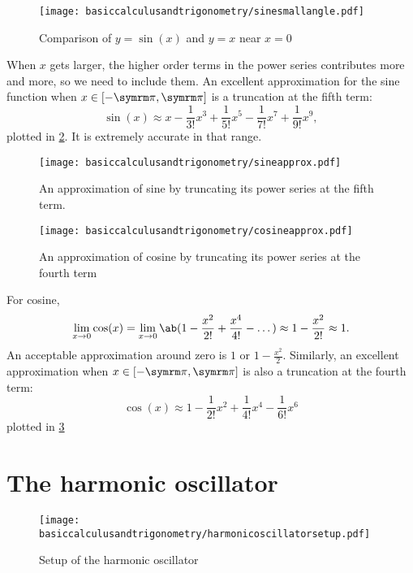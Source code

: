 \begin{figure}[ht]
	\centering
	\texttt{[image: basiccalculusandtrigonometry/sinesmallangle.pdf]}
	\caption{Comparison of $y = \sin(x)$ and $y = x$ near $x = 0$}
	\label{fig:sine_small_angle}
\end{figure}
When $x$ gets larger, the higher order terms in the power series contributes more and more, so we need to include them. An excellent approximation for the sine function when $x \in [-\cpi, \cpi]$ is a truncation at the fifth term:
\begin{equation}
	\sin(x) \approx x - \frac{1}{3!}x^3 + \frac{1}{5!}x^5 - \frac{1}{7!}x^7 + \frac{1}{9!}x^9,
\end{equation}
plotted in \cref{fig:sine_approximation}. It is extremely accurate in that range.
\begin{figure}[t]
	\centering
	\texttt{[image: basiccalculusandtrigonometry/sineapprox.pdf]}
	\caption{An approximation of sine by truncating its power series at the fifth term.}
	\label{fig:sine_approximation}
\end{figure}
\begin{figure}[t]
	\centering
	\texttt{[image: basiccalculusandtrigonometry/cosineapprox.pdf]}
	\caption{An approximation of cosine by truncating its power series at the fourth term}
	\label{fig:cosine_approximation}
\end{figure}
For cosine,
\begin{align}
	\lim_{x \appr 0}\cos(x) = \lim_{x \appr 0}\ab(1 - \frac{x^2}{2!} + \frac{x^4}{4!} - \dots) \approx 1 - \frac{x^2}{2!} \approx 1.
\end{align}
An acceptable approximation around zero is $1$ or $1 - \frac{x^2}{2}$. Similarly, an excellent approximation when $x \in [-\cpi, \cpi]$ is also a truncation at the fourth term:
\begin{equation}
	\cos(x) \approx 1 - \frac{1}{2!}x^2 + \frac{1}{4!}x^4 - \frac{1}{6!}x^6 
\end{equation}
plotted in \cref{fig:cosine_approximation}

\section{The harmonic oscillator}

\begin{figure}[ht]
	\centering
	\texttt{[image: basiccalculusandtrigonometry/harmonicoscillatorsetup.pdf]}
	\caption{Setup of the harmonic oscillator}
	\label{fig:harmonic-oscillator-setup}
\end{figure}

